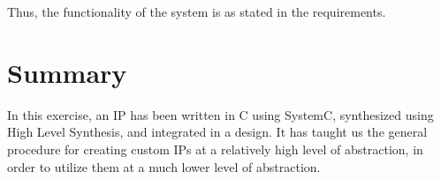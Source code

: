 Thus, the functionality of the system is as stated in the requirements.

\section{Summary}
In this exercise, an IP has been written in C using SystemC, synthesized using High Level Synthesis, and integrated in a design. It has taught us the general procedure for creating custom IPs at a relatively high level of abstraction, in order to utilize them at a much lower level of abstraction.